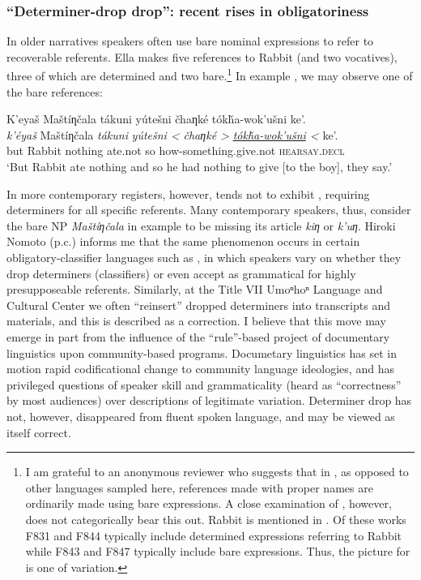 \documentclass[output=paper]{LSP/langsci}
\begin{document}
\subsubsection{“Determiner-drop drop”: recent rises in obligatoriness}\label{determinerdropdrop}

	In older  narratives speakers often use bare nominal expressions to refer to recoverable referents. Ella \citet[F831]{Deloria1932} makes five references to Rabbit (and two vocatives), three of which are determined and two bare.\footnote{I am grateful to an anonymous reviewer who suggests that in , as opposed to other languages sampled here, references made with proper names are ordinarily made using bare expressions. A close examination of \citet{Deloria1932}, however, does not categorically bear this out. Rabbit is mentioned in \citet[F831, F843, F844 and F847]{Deloria1932}. Of these works F831 and F844 typically include determined expressions referring to Rabbit while F843 and F847 typically include bare expressions. Thus, the picture for  is one of variation.} In example , we may observe one of the bare references:
	
\ea\label{deloriadrop}
	K’eyaš Maštíƞčala tákuni yútešni čhaƞké tókȟa-wok’ušni ke’.\footnotemark\\
\gll	\emph{k’éyaš} 	Maštíƞčala 	\emph{tákuni} 	\emph{yútešni <}	 \emph{čhaƞké >} 	\emph{\underline{tókȟa-wok’ušni} <}		ke’. \\
	but 			Rabbit		nothing	 	ate.not	 	 so 			 how-something.give.not 				\textsc{hearsay.decl}\\
\glt	`But Rabbit ate nothing and so he had nothing to give [to the boy], they say.'
\z

In more contemporary registers, however,  tends not to exhibit , requiring determiners for all specific referents. Many contemporary speakers, thus, consider the bare NP \emph{Maštíƞčala} in example  to be missing its article \emph{kiƞ} or \emph{k’uƞ}. Hiroki Nomoto (p.c.) informs me that the same phenomenon occurs in certain obligatory-classifier languages such as , in which speakers vary on whether they drop determiners (classifiers) or even accept  as grammatical for highly presupposeable referents. Similarly, at the Title VII Umoⁿhoⁿ Language and Cultural Center we often “reinsert” dropped determiners into transcripts and materials, and this is described as a correction. I believe that this move may emerge in part from the influence of the “rule”-based project of documentary linguistics upon community-based programs. Documetary linguistics has set in motion rapid codificational change to community language ideologies, and has privileged questions of speaker skill and grammaticality (heard as “correctness” by most audiences) over descriptions of legitimate variation. Determiner drop has not, however, disappeared from fluent spoken language, and may be viewed as itself correct.
\end{document}
